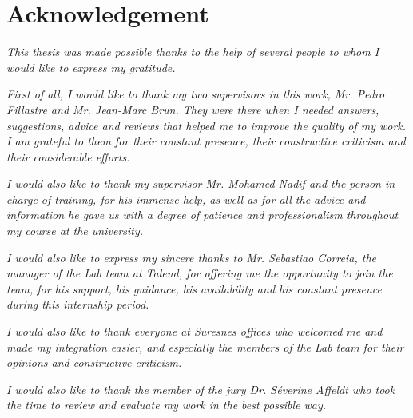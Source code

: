 \chapter*{Acknowledgement}
\thispagestyle{empty}


\vspace{0.75cm}
\textit{This thesis was made possible thanks to the help of several people to whom I would like to express my gratitude.}
\vspace{0.75cm}

\textit{ First of all, I would like to thank my two supervisors in this work, Mr. Pedro Fillastre and Mr. Jean-Marc Brun. They were there when I needed answers, suggestions, advice and reviews that helped me to improve the quality of my work. I am grateful to them for their constant presence, their constructive criticism and their considerable efforts.}

\vspace{0.75cm}

\textit{I would also like to thank my supervisor Mr. Mohamed Nadif and the person in charge of training, for his immense help, as well as for all the advice and information he gave us with a degree of patience and professionalism throughout my course at the university.}
\vspace{0.75cm}


\textit{I would also like to express my sincere thanks to Mr. Sebastiao Correia, the manager of the Lab team at Talend, for offering me the opportunity to join the team, for his support, his guidance, his availability and his constant presence during this internship period.}
\vspace{0.75cm}


\textit{I would also like to thank everyone at Suresnes offices who welcomed me and made my integration easier, and especially the members of the Lab team for their opinions and constructive criticism.}
\vspace{0.75cm}


\textit{I would also like to thank the member of the jury Dr. Séverine Affeldt who took the time to review and evaluate my work in the best possible way.}


